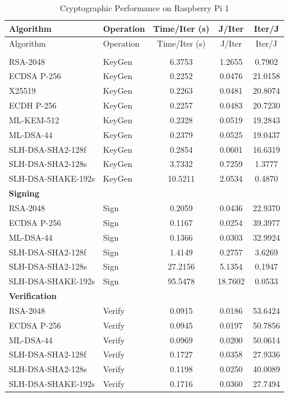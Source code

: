 \documentclass[11pt, letterpaper]{article}
\begin{document}
\begin{longtable}{llccc}
\caption{Cryptographic Performance on Raspberry Pi 1} \\
\hline
Algorithm & Operation & Time/Iter (s) & J/Iter & Iter/J \\
\hline
\endfirsthead

\hline
Algorithm & Operation & Time/Iter (s) & J/Iter & Iter/J \\
\hline
\endhead

\hline
\endfoot

\hline
\endlastfoot

\multicolumn{5}{l}{\textbf{Key Generation}} \\

RSA-2048 & KeyGen & 6.3753 & 1.2655 & 0.7902 \\
ECDSA P-256 & KeyGen & 0.2252 & 0.0476 & 21.0158 \\
X25519 & KeyGen & 0.2263 & 0.0481 & 20.8074 \\
ECDH P-256 & KeyGen & 0.2257 & 0.0483 & 20.7230 \\
ML-KEM-512 & KeyGen & 0.2328 & 0.0519 & 19.2843 \\
ML-DSA-44 & KeyGen & 0.2379 & 0.0525 & 19.0437 \\
SLH-DSA-SHA2-128f & KeyGen & 0.2854 & 0.0601 & 16.6319 \\
SLH-DSA-SHA2-128s & KeyGen & 3.7332 & 0.7259 & 1.3777 \\
SLH-DSA-SHAKE-192s & KeyGen & 10.5211 & 2.0534 & 0.4870 \\

\multicolumn{5}{l}{\textbf{Signing}} \\

RSA-2048 & Sign & 0.2059 & 0.0436 & 22.9370 \\
ECDSA P-256 & Sign & 0.1167 & 0.0254 & 39.3977 \\
ML-DSA-44 & Sign & 0.1366 & 0.0303 & 32.9924 \\
SLH-DSA-SHA2-128f & Sign & 1.4149 & 0.2757 & 3.6269 \\
SLH-DSA-SHA2-128s & Sign & 27.2156 & 5.1354 & 0.1947 \\
SLH-DSA-SHAKE-192s & Sign & 95.5478 & 18.7602 & 0.0533 \\

\multicolumn{5}{l}{\textbf{Verification}} \\

RSA-2048 & Verify & 0.0915 & 0.0186 & 53.6424 \\
ECDSA P-256 & Verify & 0.0945 & 0.0197 & 50.7856 \\
ML-DSA-44 & Verify & 0.0969 & 0.0200 & 50.0614 \\
SLH-DSA-SHA2-128f & Verify & 0.1727 & 0.0358 & 27.9336 \\
SLH-DSA-SHA2-128s & Verify & 0.1198 & 0.0250 & 40.0089 \\
SLH-DSA-SHAKE-192s & Verify & 0.1716 & 0.0360 & 27.7494 \\

\end{longtable}
\end{document}
